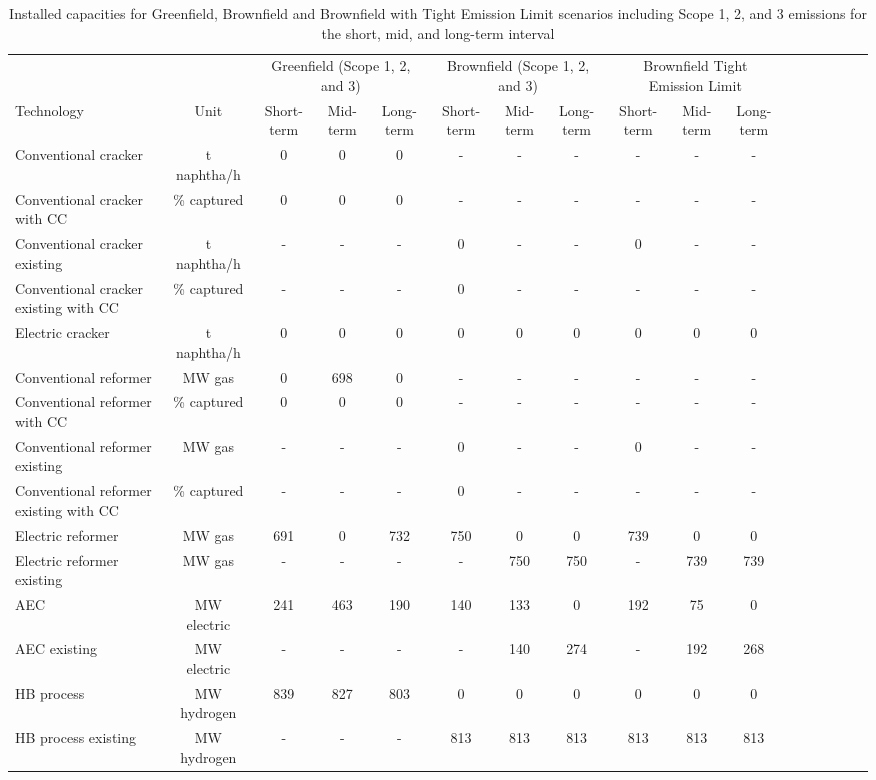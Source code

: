 \begin{table}[h!]
\centering
\caption{Installed capacities for Greenfield, Brownfield and Brownfield with Tight Emission Limit scenarios including Scope 1, 2, and 3 emissions for the short, mid, and long-term interval}
\label{tab:results_emission_limit}
\begin{adjustbox}{angle=90, max width=\textheight}\begin{tabular}{lcccccccccccccccc}
\toprule
\multicolumn{2}{r}{} & \multicolumn{3}{c}{Greenfield (Scope 1, 2, and 3)} & \multicolumn{3}{c}{Brownfield (Scope 1, 2, and 3)} & \multicolumn{3}{c}{Brownfield Tight Emission Limit} \\
Technology & Unit & Short-term & Mid-term & Long-term & Short-term & Mid-term & Long-term & Short-term & Mid-term & Long-term \\
\midrule
Conventional cracker & t naphtha/h & 0 & 0 & 0 & - & - & - & - & - & - \\
Conventional cracker with \acs{CC} & \% captured & 0 & 0 & 0 & - & - & - & - & - & - \\
Conventional cracker existing & t naphtha/h & - & - & - & 0 & - & - & 0 & - & - \\
Conventional cracker existing with \acs{CC} & \% captured & - & - & - & 0 & - & - & - & - & - \\
Electric cracker & t naphtha/h & 0 & 0 & 0 & 0 & 0 & 0 & 0 & 0 & 0 \\
Conventional reformer & MW gas & 0 & 698 & 0 & - & - & - & - & - & - \\
Conventional reformer with \acs{CC} & \% captured & 0 & 0 & 0 & - & - & - & - & - & - \\
Conventional reformer existing & MW gas & - & - & - & 0 & - & - & 0 & - & - \\
Conventional reformer existing with \acs{CC} & \% captured & - & - & - & 0 & - & - & - & - & - \\
Electric reformer & MW gas & 691 & 0 & 732 & 750 & 0 & 0 & 739 & 0 & 0 \\
Electric reformer existing & MW gas & - & - & - & - & 750 & 750 & - & 739 & 739 \\
\acs{AEC} & MW electric & 241 & 463 & 190 & 140 & 133 & 0 & 192 & 75 & 0 \\
\acs{AEC} existing & MW electric & - & - & - & - & 140 & 274 & - & 192 & 268 \\
\acs{HB} process & MW hydrogen & 839 & 827 & 803 & 0 & 0 & 0 & 0 & 0 & 0 \\
\acs{HB} process existing & MW hydrogen & - & - & - & 813 & 813 & 813 & 813 & 813 & 813 \\

\end{tabular}
\end{adjustbox}
\end{table}
